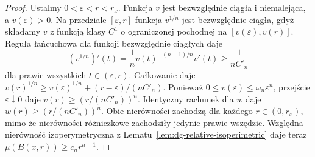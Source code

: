\begin{proof}
Ustalmy $0<\varepsilon<r<r_x$.
Funkcja $v$ jest bezwzględnie ciągła i niemalejąca,
a $v(\varepsilon)>0$. Na przedziale
$[\varepsilon,r]$ funkcja $v^{1/n}$ jest
bezwzględnie ciągła, gdyż składamy $v$ z funkcją
klasy $C^1$ o ograniczonej pochodnej na
$[v(\varepsilon),v(r)]$. Reguła łańcuchowa dla
funkcji bezwzględnie ciągłych daje
\[
 (v^{1/n})'(t)=\frac1n
 v(t)^{-(n-1)/n}v'(t)\ge\frac1{nC'_n}
\]
dla prawie wszystkich $t\in(\varepsilon,r)$.
Całkowanie daje
$v(r)^{1/n}\ge v(\varepsilon)^{1/n}+
(r-\varepsilon)/(nC'_n)$. Ponieważ
$0\le v(\varepsilon)\le\omega_n\varepsilon^n$,
przejście $\varepsilon\downarrow0$ daje
$v(r)\ge(r/(nC'_n))^n$. Identyczny rachunek
dla $w$ daje $w(r)\ge(r/(nC'_n))^n$.
Obie nierówności zachodzą dla każdego
$r\in(0,r_x)$, mimo że nierówności różniczkowe
zachodziły jedynie prawie wszędzie.
Względna nierówność izoperymetryczna z
Lematu~\ref{lem:dg-relative-isoperimetric}
daje teraz $\mu(B(x,r))\ge c_nr^{n-1}$.
\end{proof}

